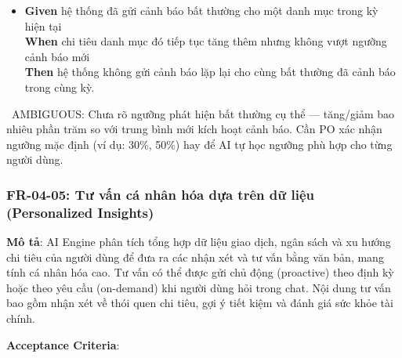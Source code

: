 \begin{itemize}
\item \textbf{Given} hệ thống đã gửi cảnh báo bất thường cho một danh mục trong kỳ hiện tại  \\ \hspace*{1.5em}  \textbf{When} chi tiêu danh mục đó tiếp tục tăng thêm nhưng không vượt ngưỡng cảnh báo mới  \\ \hspace*{1.5em}  \textbf{Then} hệ thống không gửi cảnh báo lặp lại cho cùng bất thường đã cảnh báo trong cùng kỳ.
\end{itemize}
\warningicon\  AMBIGUOUS: Chưa rõ ngưỡng phát hiện bất thường cụ thể — tăng/giảm bao nhiêu phần trăm so với trung bình mới kích hoạt cảnh báo. Cần PO xác nhận ngưỡng mặc định (ví dụ: 30\%, 50\%) hay để AI tự học ngưỡng phù hợp cho từng người dùng.



\subsubsection{FR-04-05: Tư vấn cá nhân hóa dựa trên dữ liệu (Personalized Insights)}

\textbf{Mô tả}: AI Engine phân tích tổng hợp dữ liệu giao dịch, ngân sách và xu hướng chi tiêu của người dùng để đưa ra các nhận xét và tư vấn bằng văn bản, mang tính cá nhân hóa cao. Tư vấn có thể được gửi chủ động (proactive) theo định kỳ hoặc theo yêu cầu (on-demand) khi người dùng hỏi trong chat. Nội dung tư vấn bao gồm nhận xét về thói quen chi tiêu, gợi ý tiết kiệm và đánh giá sức khỏe tài chính.



\textbf{Acceptance Criteria}:


